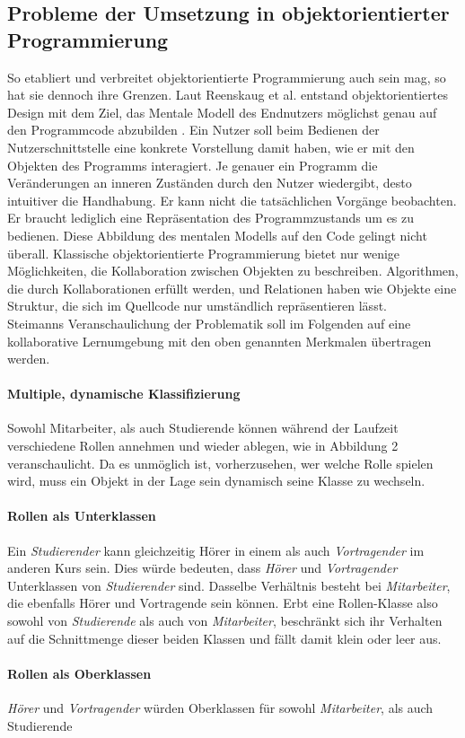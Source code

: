 \documentclass[conference]{IEEEtran}
\begin{document}
	
\subsection{Probleme der Umsetzung in objektorientierter Programmierung}  
So etabliert und verbreitet objektorientierte Programmierung auch sein mag, so hat sie dennoch ihre Grenzen. Laut Reenskaug et al. entstand objektorientiertes Design mit dem Ziel, das Mentale Modell des Endnutzers möglichst genau auf den Programmcode abzubilden \cite{reenskaug2009dci}. Ein Nutzer soll beim Bedienen der Nutzerschnittstelle eine konkrete Vorstellung damit haben, wie er mit den Objekten des Programms interagiert. Je genauer ein Programm die Veränderungen an inneren Zuständen durch den Nutzer wiedergibt, desto intuitiver die Handhabung. Er kann nicht die tatsächlichen Vorgänge beobachten. Er braucht lediglich eine Repräsentation des Programmzustands um es zu bedienen. Diese Abbildung des mentalen Modells auf den Code gelingt nicht überall. Klassische objektorientierte Programmierung bietet nur wenige Möglichkeiten, die Kollaboration zwischen Objekten zu beschreiben. Algorithmen, die durch Kollaborationen erfüllt werden, und Relationen haben wie Objekte eine Struktur, die sich im Quellcode nur umständlich repräsentieren lässt. \\Steimanns Veranschaulichung der Problematik soll im Folgenden auf eine kollaborative Lernumgebung mit den oben genannten Merkmalen übertragen werden\cite{steimann2000representation}.\paragraph{Multiple, dynamische Klassifizierung} Sowohl Mitarbeiter, als auch Studierende können während der Laufzeit verschiedene Rollen annehmen und wieder ablegen, wie in Abbildung 2 veranschaulicht. Da es unmöglich ist, vorherzusehen, wer welche Rolle spielen wird, muss ein Objekt in der Lage sein dynamisch seine Klasse zu wechseln. \paragraph{Rollen als Unterklassen} Ein \textit{Studierender} kann gleichzeitig Hörer in einem als auch \textit{Vortragender} im anderen Kurs sein. Dies würde bedeuten, dass \textit{Hörer} und \textit{Vortragender} Unterklassen von \textit{Studierender} sind. Dasselbe Verhältnis besteht bei \textit{Mitarbeiter}, die ebenfalls Hörer und Vortragende sein können. Erbt eine Rollen-Klasse also sowohl von \textit{Studierende} als auch von \textit{Mitarbeiter}, beschränkt sich ihr Verhalten auf die Schnittmenge dieser beiden Klassen und fällt damit klein oder leer aus.\paragraph{Rollen als Oberklassen} \textit{Hörer} und \textit{Vortragender} würden Oberklassen für sowohl \textit{Mitarbeiter}, als auch \textit{}Studierende 
\end{document}
